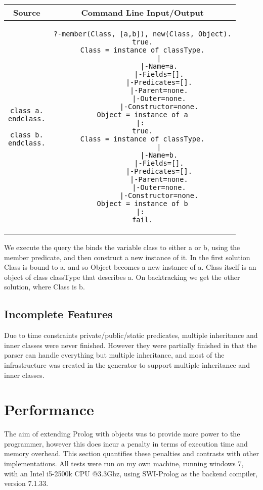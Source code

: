 \documentclass[12pt,a4paper,twoside,openright]{report}
\begin{document}
	\begin{center}
\begin{tabular}{c|c}
Source & Command Line Input/Output \\
\hline
	\small
\begin{lstlisting}
class a.
endclass.

class b.
endclass.
\end{lstlisting}
&
	\small
\begin{lstlisting}
?-member(Class, [a,b]), new(Class, Object).
true.
Class = instance of classType.
        |
        |-Name=a.
        |-Fields=[].
        |-Predicates=[].
        |-Parent=none.
        |-Outer=none.
        |-Constructor=none.
Object = instance of a
|: 
true.
Class = instance of classType.
        |
        |-Name=b.
        |-Fields=[].
        |-Predicates=[].
        |-Parent=none.
        |-Outer=none.
        |-Constructor=none.
Object = instance of b
|: 
fail.
\end{lstlisting}
\\
\end{tabular}
\end{center}

We execute the query the binds the variable class to either a or b, using the member predicate, and then construct a new instance of it. In the first solution Class is bound to a, and so Object becomes a new instance of a. Class itself is an object of class classType that describes a. On backtracking we get the other solution, where Class is b.

\subsection{Incomplete Features}

Due to time constraints private/public/static predicates, multiple inheritance and inner classes were never finished.  However they were partially finished in that the parser can handle everything but multiple inheritance, and most of the infrastructure was created in the generator to support multiple inheritance and inner classes. 

\section{Performance}

The aim of extending Prolog with objects was to provide more power to the programmer, however this does incur a penalty in terms of execution time and memory overhead. This section quantifies these penalties and contrasts with other implementations. All tests were run on my own machine, running windows 7, with an Intel i5-2500k CPU @3.3Ghz, using SWI-Prolog as the backend compiler, version 7.1.33.
\end{document}
